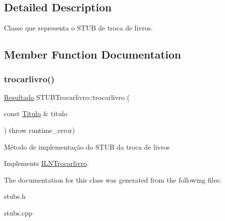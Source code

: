 \subsection{Detailed Description}
Classe que representa o S\+T\+UB de troca de livros. 

\subsection{Member Function Documentation}
\mbox{\label{classSTUBTrocarlivro_ac94fcf8594839d0edff8f2c9ab556d21}} 
\subsubsection{\texorpdfstring{trocarlivro()}{trocarlivro()}}
{\footnotesize\ttfamily \hyperlink{classResultado}{Resultado} S\+T\+U\+B\+Trocarlivro\+::trocarlivro (\begin{DoxyParamCaption}\item[{const \hyperlink{classTitulo}{Titulo} \&}]{titulo }\end{DoxyParamCaption}) throw  runtime\+\_\+error) \hspace{0.3cm}{\ttfamily [virtual]}}

Método de implementação do S\+T\+UB da troca de livros 

Implements \hyperlink{classILNTrocarlivro}{I\+L\+N\+Trocarlivro}.



The documentation for this class was generated from the following files\+:\begin{DoxyCompactItemize}
\item 
stubs.\+h\item 
stubs.\+cpp\end{DoxyCompactItemize}
